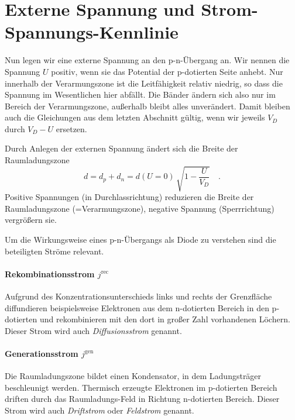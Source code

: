\section*{Externe Spannung und Strom-Spannungs-Kennlinie}

Nun legen wir eine externe Spannung an den p-n-Übergang an. Wir nennen die Spannung $U$ positiv, wenn sie das Potential der p-dotierten Seite anhebt. Nur innerhalb der  Verarmungszone ist die Leitfähigkeit relativ niedrig, so dass die Spannung im Wesentlichen hier abfällt. Die Bänder ändern sich also nur im Bereich der Verarmungszone, außerhalb bleibt alles unverändert. Damit bleiben auch die Gleichungen aus dem letzten Abschnitt gültig, wenn wir jeweils $V_D$ durch $V_D - U$ ersetzen.

Durch Anlegen der externen Spannung ändert sich die Breite der Raumladungszone
\begin{equation}
    d = d_p + d_n = d(U=0) \, \sqrt{1 - \frac{U}{V_D} }\quad .
\end{equation} 
Positive Spannungen (in Durchlassrichtung) reduzieren die Breite der Raumladungszone (=Verarmungszone), negative Spannung (Sperrrichtung) vergrößern sie. 

Um die Wirkungsweise eines p-n-Übergangs als Diode zu verstehen sind die beteiligten Ströme relevant.

\paragraph*{Rekombinationsstrom  $j^\text{rec}$} Aufgrund des Konzentrationsunterschieds links und rechts der Grenzfläche diffundieren beispielsweise Elektronen aus dem n-dotierten Bereich  in den p-dotierten und rekombinieren mit den dort in großer Zahl vorhandenen Löchern. Dieser Strom wird auch \emph{Diffusionsstrom} genannt.

\paragraph*{Generationsstrom $j^\text{gen}$} Die Raumladungszone bildet einen Kondensator, in dem Ladungsträger beschleunigt werden. Thermisch erzeugte Elektronen im p-dotierten Bereich driften durch das Raumladungs-Feld in Richtung n-dotierten Bereich. Dieser Strom wird auch \emph{Driftstrom} oder \emph{Feldstrom} genannt.

